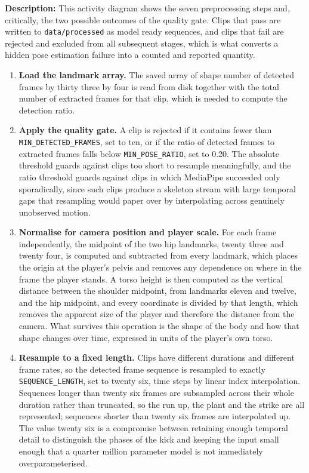 \noindent
\textbf{Description:} This activity diagram shows the seven preprocessing steps and, critically, the two possible outcomes of the quality gate. Clips that pass are written to \texttt{data/processed} as model ready sequences, and clips that fail are rejected and excluded from all subsequent stages, which is what converts a hidden pose estimation failure into a counted and reported quantity.

\begin{enumerate}[label=\arabic*.]
    \item \textbf{Load the landmark array.} The saved array of shape number of detected frames by thirty three by four is read from disk together with the total number of extracted frames for that clip, which is needed to compute the detection ratio.

    \item \textbf{Apply the quality gate.} A clip is rejected if it contains fewer than \texttt{MIN\_DETECTED\_FRAMES}, set to ten, or if the ratio of detected frames to extracted frames falls below \texttt{MIN\_POSE\_RATIO}, set to 0.20. The absolute threshold guards against clips too short to resample meaningfully, and the ratio threshold guards against clips in which MediaPipe succeeded only sporadically, since such clips produce a skeleton stream with large temporal gaps that resampling would paper over by interpolating across genuinely unobserved motion.

    \item \textbf{Normalise for camera position and player scale.} For each frame independently, the midpoint of the two hip landmarks, twenty three and twenty four, is computed and subtracted from every landmark, which places the origin at the player's pelvis and removes any dependence on where in the frame the player stands. A torso height is then computed as the vertical distance between the shoulder midpoint, from landmarks eleven and twelve, and the hip midpoint, and every coordinate is divided by that length, which removes the apparent size of the player and therefore the distance from the camera. What survives this operation is the shape of the body and how that shape changes over time, expressed in units of the player's own torso.

    \item \textbf{Resample to a fixed length.} Clips have different durations and different frame rates, so the detected frame sequence is resampled to exactly \texttt{SEQUENCE\_LENGTH}, set to twenty six, time steps by linear index interpolation. Sequences longer than twenty six frames are subsampled across their whole duration rather than truncated, so the run up, the plant and the strike are all represented; sequences shorter than twenty six frames are interpolated up. The value twenty six is a compromise between retaining enough temporal detail to distinguish the phases of the kick and keeping the input small enough that a quarter million parameter model is not immediately overparameterised.


\end{enumerate}
